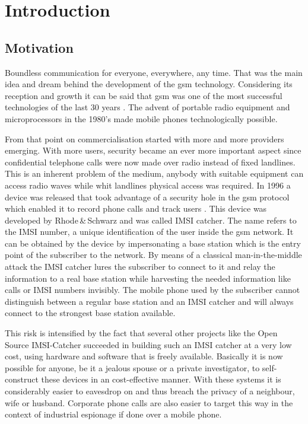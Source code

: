 \chapter{Introduction}

\section{Motivation}
Boundless communication for everyone, everywhere, any time.
That was the main idea and dream behind the development of the \gls{gsm} technology.
Considering its reception and growth it can be said that \gls{gsm} was one of the most successful technologies of the last 30 years  \cite{GSM2009,GSM_history2011,GSM_stats2011}.
The advent of portable radio equipment and microprocessors in the 1980's made mobile phones technologically possible.

From that point on commercialisation started with more and more providers emerging.
With more users, security became an ever more important aspect since confidential telephone calls were now made over radio instead of fixed landlines.
This is an inherent problem of the medium, anybody with suitable equipment can access radio waves while whit landlines physical access was required.
In 1996 a device was released that took advantage of a security hole in the \gls{gsm} protocol which enabled it to record phone calls and track users \cite{fox}.
This device was developed by Rhode\,\&\,Schwarz and was called IMSI catcher.
The name refers to the IMSI number, a unique identification of the user inside the \gls{gsm} network.
It can be obtained by the device by impersonating a base station which is the entry point of the subscriber to the network.
By means of a classical man-in-the-middle attack the IMSI catcher lures the subscriber to connect to it and relay the information to a real base station while harvesting the needed information like calls or IMSI numbers invisibly.
The mobile phone used by the subscriber cannot distinguish between a regular base station and an IMSI catcher and will always connect to the strongest base station available.

This risk is intensified by the fact that several other projects like the Open Source IMSI-Catcher \cite{dennis} succeeded in building such an IMSI catcher at a very low cost, using hardware and software that is freely available.
Basically it is now possible for anyone, be it a jealous spouse or a private investigator, to self-construct these devices in an cost-effective manner.
With these systems it is considerably easier to eavesdrop on and thus breach the privacy of a neighbour, wife or husband.
Corporate phone calls are also easier to target this way in the context of industrial espionage if done over a mobile phone.


